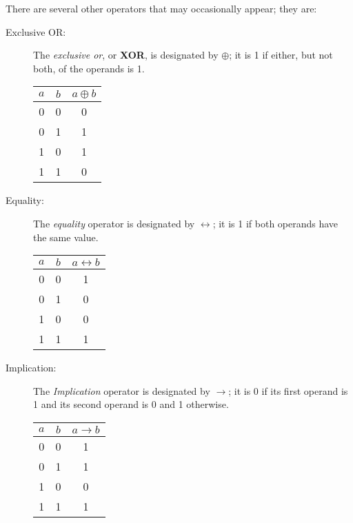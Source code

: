 \documentclass[letterpaper]{article}
\begin{document}
There are several other operators that may occasionally appear; they are: 
\begin{description}
    \item[Exclusive OR:] The \emph{exclusive or}, or \textbf{XOR}, is designated by $\oplus$; it is 1 if either, but not both, of the operands is 1. 
    \begin{center}
        \begin{tabular}{c c|c}
            $a$ & $b$ & $a \oplus b$ \\ 
            \hline 
            0 & 0 & 0 \\ 
            0 & 1 & 1 \\ 
            1 & 0 & 1 \\ 
            1 & 1 & 0
        \end{tabular}
    \end{center} 

    \item[Equality:] The \emph{equality} operator is designated by $\longleftrightarrow$; it is 1 if both operands have the same value. 
    \begin{center}
        \begin{tabular}{c c|c}
            $a$ & $b$ & $a \longleftrightarrow b$ \\ 
            \hline 
            0 & 0 & 1 \\ 
            0 & 1 & 0 \\ 
            1 & 0 & 0 \\ 
            1 & 1 & 1
        \end{tabular}
    \end{center} 
    
    \item[Implication:] The \emph{Implication} operator is designated by $\longrightarrow$; it is 0 if its first operand is 1 and its second operand is 0 and 1 otherwise. 
    \begin{center}
        \begin{tabular}{c c|c}
            $a$ & $b$ & $a \longrightarrow b$ \\ 
            \hline 
            0 & 0 & 1 \\ 
            0 & 1 & 1 \\ 
            1 & 0 & 0 \\ 
            1 & 1 & 1
        \end{tabular}
    \end{center} 
\end{description}
\end{document}

